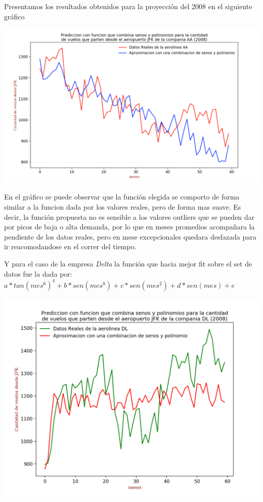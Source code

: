 \documentclass{endm}
\begin{document}
Presentamos los resultados obtenidos para la proyecci\'on del 2008 en el siguiente gr\'afico

\begin{center}
\includegraphics[scale=0.4]{imagenes/AA.png}
\end{center}

En el gr\'afico se puede observar que la funci\'on elegida se comporto de forma similar a la funcion dada por los valores reales, pero de forma mas suave. Es decir, la funci\'on propuesta no es sensible a los valores outliers que se pueden dar por picos de baja o alta demanda, por lo que en meses promedios acompa\~nara la pendiente de los datos reales, pero en mese excepcionales quedara desfazada para ir reacomodandose en el correr del tiempo.

Y para el caso de la empresa \textit{Delta} la funci\'on que hacia mejor fit sobre el set de datos fue la dada por:
$a * tan(mes^6)^4 + b * sen(mes^8) + c * sen(mes^2) + d * sen(mes) +  e$


\begin{center}
\includegraphics[scale=0.6]{imagenes/DL.png}
\end{center}
\end{document}
